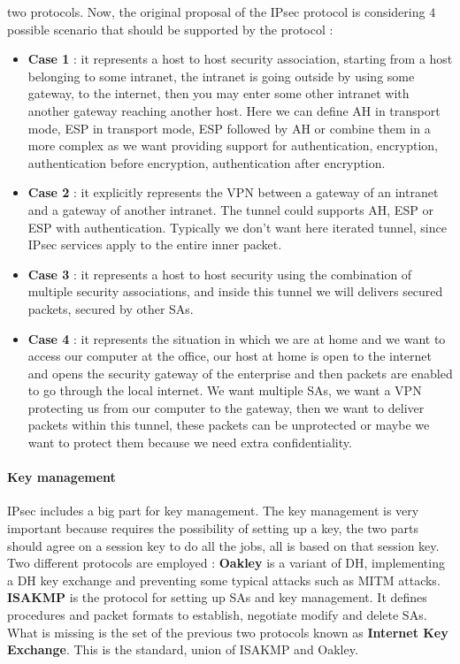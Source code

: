 \documentclass[11pt]{article}
\begin{document}
two protocols. Now, the original proposal of the IPsec protocol is considering $4$ possible scenario that should be supported by the protocol :
\begin{itemize}
\item \textbf{Case 1} : it represents a host to host security association, starting from a host belonging to some intranet, the intranet is going outside by using some gateway, to the internet, then you may enter some other intranet with another gateway reaching another host. Here we can define AH in transport mode, ESP in transport mode, ESP followed by AH or combine them in a more complex as we want providing support for authentication, encryption, authentication before encryption, authentication after encryption.
\item \textbf{Case 2} : it explicitly represents the VPN between a gateway of an intranet and a gateway of another intranet. The tunnel could supports AH, ESP or ESP with authentication. Typically we don't want here iterated tunnel, since IPsec services apply to the entire inner packet.
\item \textbf{Case 3} : it represents a host to host security using the combination of multiple security associations, and inside this tunnel we will delivers secured packets, secured by other SAs.
\item \textbf{Case 4} : it represents the situation in which we are at home and we want to access our computer at the office, our host at home is open to the internet and opens the security gateway of the enterprise and then packets are enabled to go through the local internet. We want multiple SAs, we want a VPN protecting us from our computer to the gateway, then we want to deliver packets within this tunnel, these packets can be unprotected or maybe we want to protect them because we need extra confidentiality.
\end{itemize}
\paragraph{Key management} IPsec includes a big part for key management. The key management is very important because requires the possibility of setting up a key, the two parts should agree on a session key to do all the jobs, all is based on that session key. Two different protocols are employed : \textbf{Oakley} is a variant of DH, implementing a DH key exchange and preventing some typical attacks such as MITM attacks. \textbf{ISAKMP} is the protocol for setting up SAs and key management. It defines procedures and packet formats to establish, negotiate modify and delete SAs. What is missing is the set of the previous two protocols known as \textbf{Internet Key Exchange}. This is the standard, union of ISAKMP and Oakley.
\end{document}
